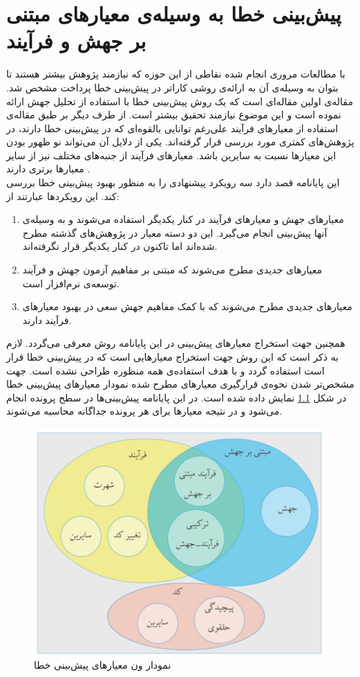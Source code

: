 \chapter{پیش‌بینی خطا به وسیله‌ی معیارهای مبتنی بر جهش و فرآیند}
 
\label{chap:method}
با  مطالعات مروری انجام شده نقاطی از این حوزه که نیازمند پژوهش بیشتر هستند تا بتوان به وسیله‌ی آن به ارائه‌ی روشی کاراتر در پیش‌بینی خطا پرداخت مشخص شد. مقاله‌ی \cite{bowes2016mutation} اولین مقاله‌ای است که  یک  روش پیش‌بینی خطا با استفاده از تحلیل جهش ارائه نموده  است و این موضوع نیازمند تحقیق بیشتر است. از طرف دیگر بر طبق مقاله‌ی \cite{radjenovic2013software} استفاده از معیارهای فرآیند علی‌رغم توانایی بالقوه‌ای که در پیش‌بینی خطا دارند، در پژوهش‌های کمتری مورد بررسی قرار گرفته‌اند. یکی از دلایل آن می‌تواند نو ظهور بودن این معیارها نسبت به سایرین باشد. معیارهای فرآیند از جنبه‌های مختلف نیز از سایر معیار‌ها برتری دارند \cite{rahman2013and}. \\
این پایانامه قصد دارد سه رویکرد  پیشنهادی را به منظور بهبود پیش‌بینی خطا بررسی کند.  این رویکردها عبارتند از:
\begin{enumerate}
\item
معیارهای جهش و معیارهای فرآیند در کنار یکدیگر استفاده می‌شوند و به وسیله‌ی آنها پیش‌بینی انجام می‌گیرد. این دو دسته معیار در پژوهش‌های گذشته مطرح شده‌اند اما تاکنون در کنار یکدیگر قرار نگرفته‌اند.
\item
معیارهای جدیدی مطرح می‌شوند که مبتنی بر مفاهیم آزمون جهش و فرآیند توسعه‌ی نرم‌افزار است.
\item
معیارهای جدیدی مطرح می‌شوند که با کمک مفاهیم جهش سعی در بهبود معیارهای فرآیند دارند.
\end{enumerate}

همچنین جهت استخراج معیارهای پیش‌بینی در این پایانامه روش 
 معرفی می‌گردد. لازم به ذکر است که این روش جهت  استخراج معیارهایی است که در پیش‌بینی خطا قرار است استفاده گردد و با هدف استفاده‌ی همه منظوره طراحی نشده است. جهت مشخص‌تر شدن نحوه‌ی قرارگیری معیارهای مطرح شده نمودار معیارهای پیش‌بینی خطا در شکل \ref{fig:venn} نمایش داده شده است.  در این پایانامه پیش‌بینی‌ها در سطح پرونده انجام می‌شود و در نتیجه معیارها برای هر پرونده جداگانه محاسبه می‌شوند.

\begin{figure}[H]
	\centering
	\includegraphics[width=.7\textwidth]{img/method/venn.png}
	\caption{نمودار ون معیارهای پیش‌بینی خطا }
	\label{fig:venn}
\end{figure}



